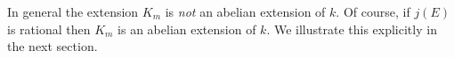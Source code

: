 \begin{rem}
  \label{rem:not-abelian-over-k}
  In general the extension $K_{m}$ is \emph{not} an abelian extension of $k$.  Of
  course, if $j(E)$ is rational then $K_{m}$ is an abelian extension of $k$.  We
  illustrate this explicitly in the next section.
\end{rem}



